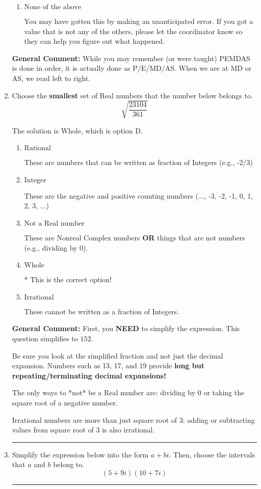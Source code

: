 \documentclass{extbook}[14pt]
\newcommand{\litem}[1]{\item #1

\rule{\textwidth}{0.4pt}}
\begin{document}
\begin{enumerate}
{\begin{enumerate}[label=\Alph*.]
 102.046, which corresponds to two Order of Operations errors.
\item \( \text{None of the above} \)

 You may have gotten this by making an unanticipated error. If you got a value that is not any of the others, please let the coordinator know so they can help you figure out what happened.
\end{enumerate}

\textbf{General Comment:} While you may remember (or were taught) PEMDAS is done in order, it is actually done as P/E/MD/AS. When we are at MD or AS, we read left to right.
}
\litem{
Choose the \textbf{smallest} set of Real numbers that the number below belongs to.
\[ \sqrt{\frac{23104}{361}} \]

The solution is \( \text{Whole} \), which is option D.\begin{enumerate}[label=\Alph*.]
\item \( \text{Rational} \)

These are numbers that can be written as fraction of Integers (e.g., -2/3)
\item \( \text{Integer} \)

These are the negative and positive counting numbers (..., -3, -2, -1, 0, 1, 2, 3, ...)
\item \( \text{Not a Real number} \)

These are Nonreal Complex numbers \textbf{OR} things that are not numbers (e.g., dividing by 0).
\item \( \text{Whole} \)

* This is the correct option!
\item \( \text{Irrational} \)

These cannot be written as a fraction of Integers.
\end{enumerate}

\textbf{General Comment:} First, you \textbf{NEED} to simplify the expression. This question simplifies to $152$. 
 
 Be sure you look at the simplified fraction and not just the decimal expansion. Numbers such as 13, 17, and 19 provide \textbf{long but repeating/terminating decimal expansions!} 
 
 The only ways to *not* be a Real number are: dividing by 0 or taking the square root of a negative number. 
 
 Irrational numbers are more than just square root of 3: adding or subtracting values from square root of 3 is also irrational.
}
\litem{
Simplify the expression below into the form $a+bi$. Then, choose the intervals that $a$ and $b$ belong to.
\[ (5 + 9 i)(10 + 7 i) \]

}
\end{enumerate}
\end{document}
